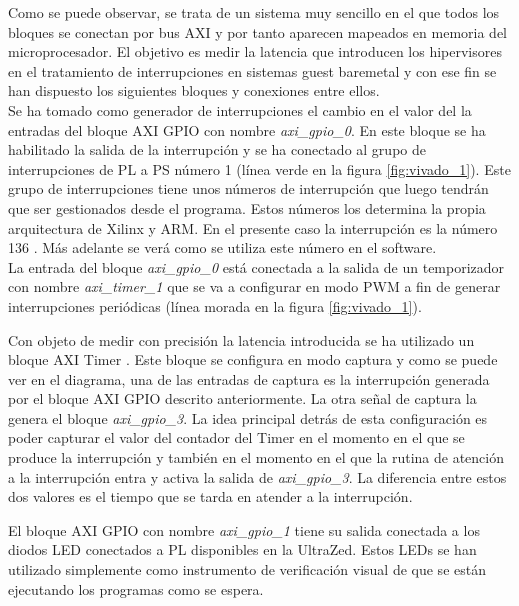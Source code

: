 Como se puede observar, se trata de un sistema muy sencillo en el que todos los bloques se conectan por bus AXI y por tanto aparecen mapeados en memoria del microprocesador. El objetivo es medir la latencia que introducen los hipervisores en el tratamiento de interrupciones en sistemas guest baremetal y con ese fin se han dispuesto los siguientes bloques y conexiones entre ellos.\\

Se ha tomado como generador de interrupciones el cambio en el valor del la entradas del bloque \acrshort{AXI} \acrshort{GPIO} con nombre \textit{axi\_gpio\_0}.
En este bloque se ha habilitado la salida de la interrupción y se ha conectado al grupo de interrupciones de \acrshort{PL} a \acrshort{PS} número 1 (línea verde en la figura \ref{fig:vivado_1}). Este grupo de interrupciones tiene unos números de interrupción que luego tendrán que ser gestionados desde el programa. Estos números los determina la propia arquitectura de Xilinx y ARM. En el presente caso la interrupción es la número 136 \cite{axi_trm}. Más adelante se verá como se utiliza este número en el software.\\
La entrada del bloque \textit{axi\_gpio\_0} está conectada a la salida de un temporizador con nombre \textit{axi\_timer\_1} que se va a configurar en modo \acrshort{PWM} a fin de generar interrupciones periódicas (línea morada en la figura \ref{fig:vivado_1}).


Con objeto de medir con precisión la latencia introducida se ha utilizado un bloque \acrshort{AXI} Timer \cite{axi_timer}. Este bloque se configura en modo captura y como se puede ver en el diagrama, una de las entradas de captura es la interrupción generada por el bloque \acrshort{AXI} \acrshort{GPIO} descrito anteriormente. La otra señal de captura la genera el bloque \textit{axi\_gpio\_3}. La idea principal detrás de esta configuración es poder capturar el valor del contador del Timer en el momento en el que se produce la interrupción y también en el momento en el que la rutina de atención a la interrupción entra y activa la salida de \textit{axi\_gpio\_3}. La diferencia entre estos dos valores es el tiempo que se tarda en atender a la interrupción.

El bloque \acrshort{AXI} \acrshort{GPIO} con nombre \textit{axi\_gpio\_1} tiene su salida conectada a los diodos LED conectados a PL disponibles en la UltraZed. Estos LEDs se han utilizado simplemente como instrumento de verificación visual de que se están ejecutando los programas como se espera.\\

